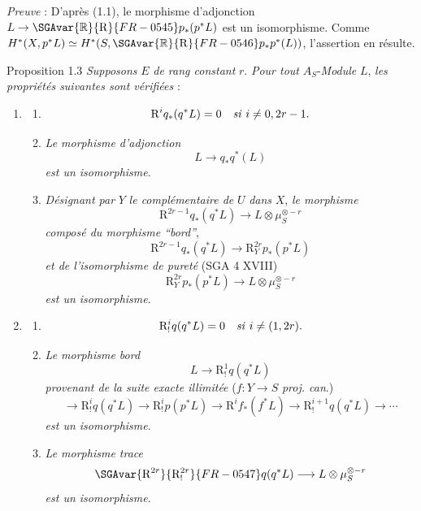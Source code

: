 \emph{Preuve} : D'après (1.1), le morphisme d'adjonction $L\to \SGAvar{\mathbb{R}}{\mathrm{R}}{FR-0545} p_*(p^*L)$ est un isomorphisme. Comme $H^*(X,p^*L)\simeq H^*(S,\SGAvar{\mathbb{R}}{\mathrm{R}}{FR-0546} p_*p^*(L))$, l'assertion en résulte.

\begin{statement}{Proposition 1.3}
\emph{Supposons} $E$ \emph{de rang constant} $r$. \emph{Pour tout} $A_S$-\emph{Module} $L$, \emph{les propriétés suivantes sont vérifiées} :
\begin{enumerate}[label=(\roman*)]
\item
\begin{enumerate}[label=\alph*)]
\item
\[
\mathrm{R}^i q_*(q^*L)=0\quad\text{\emph{si} }i\ne 0,2r-1.
\]
\item \emph{Le morphisme d'adjonction}
\[
L\longrightarrow q_*q^*(L)
\]
\emph{est un isomorphisme}.
\item \emph{Désignant par} $Y$ \emph{le complémentaire de} $U$
\emph{dans} $X$, \emph{le morphisme}
\[
\mathrm{R}^{2r-1}q_*(q^*L)\longrightarrow L\otimes\mu_S^{\otimes -r}
\]
\emph{composé du morphisme ``bord''},
\[
\mathrm{R}^{2r-1}q_*(q^*L)\longrightarrow \mathrm{R}_Y^{2r}p_*(p^*L)
\tag{1}
\]
\emph{et de l'isomorphisme de pureté} (SGA 4 XVIII)
\[
\mathrm{R}_Y^{2r}p_*(p^*L)\longrightarrow L\otimes\mu_S^{\otimes -r}
\]
\emph{est un isomorphisme}.
\end{enumerate}
\item
\begin{enumerate}[label=\alph*)]
\item
\[
\mathrm{R}_!^i q(q^*L)=0\quad\text{\emph{si} }i\ne (1,2r).
\]
\item \emph{Le morphisme bord}
\[
L\longrightarrow \mathrm{R}_!^1 q(q^*L)
\]
\emph{provenant de la suite exacte illimitée} ($f:Y\to S$ \emph{proj. can}.)
\[
\longrightarrow \mathrm{R}_!^i q(q^*L)\longrightarrow \mathrm{R}_!^i p(p^*L)
\longrightarrow \mathrm{R}^i f_*(f^*L)\longrightarrow \mathrm{R}_!^{i+1}q(q^*L)\longrightarrow\cdots
\]
\emph{est un isomorphisme}.
\item \emph{Le morphisme trace}
\[
\SGAvar{\mathrm{R}^{2r}}{\mathrm{R}_!^{2r}}{FR-0547}q(q^*L)\longrightarrow L\otimes\mu_S^{\otimes -r}
\]
\emph{est un isomorphisme}.
\end{enumerate}
\end{enumerate}
\end{statement}

